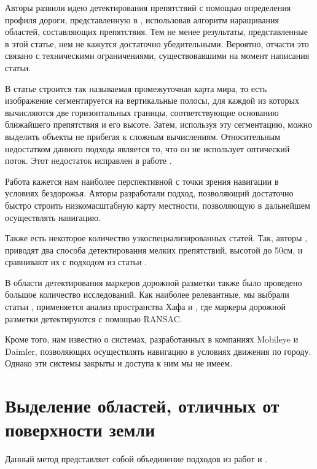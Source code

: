 \documentclass[aps,%
14pt,%
final,%
oneside,
onecolumn,%
musixtex, %
superscriptaddress,%
centertags]{extarticle} %
\begin{document}
Авторы \cite{broggi2006single} развили идею детектирования препятствий с помощью определения профиля дороги, представленную в \cite{labayrade2002real}, использовав алгоритм наращивания областей, составляющих препятствия. Тем не менее результаты, представленные в этой статье, нем не кажутся достаточно убедительными. Вероятно, отчасти это связано с техническими ограничениями, существовавшими на момент написания статьи.

В статье \cite{pfeiffer2010efficient} строится так называемая промежуточная карта мира, то есть изображение сегментируется на вертикальные полосы, для каждой из которых вычисляются две горизонтальных границы, соответствующие основанию ближайшего препятствия и его высоте. Затем, используя эту сегментацию, можно выделить объекты не прибегая к сложным вычислениям. Относительным недостатком данного подхода является то, что он не использует оптический поток. Этот недостаток исправлен в работе \cite{benenson2011stixels}.

Работа \cite{broggi2013terrain} кажется нам наиболее перспективной с точки зрения навигации в условиях бездорожья. Авторы разработали подход, позволяющий достаточно быстро строить низкомасштабную карту местности, позволяющую в дальнейшем осуществлять навигацию.

Также есть некоторое количество узкоспециализированных статей. Так, авторы \cite{pinggera2016lost}, приводят два способа детектирования мелких препятствий, высотой до 50см, и сравнивают их с подходом из статьи \cite{pfeiffer2010efficient}.

В области детектирования маркеров дорожной разметки также было проведено большое количество исследований. Как наиболее релевантные, мы выбрали статьи \cite{song2017real}, применяется анализ пространства Хафа и \cite{aly2008real}, где маркеры дорожной разметки детектируются с помощью RANSAC. 

Кроме того, нам известно о системах, разработанных в компаниях Mobileye и Daimler, позволяющих осуществлять навигацию в условиях движения по городу. Однако эти системы закрыты и доступа к ним мы не имеем.

\section{ Выделение областей, отличных от поверхности земли }

Данный метод представляет собой объединение подходов из работ \cite{labayrade2002real} и \cite{broggi2006single}.
\end{document}
